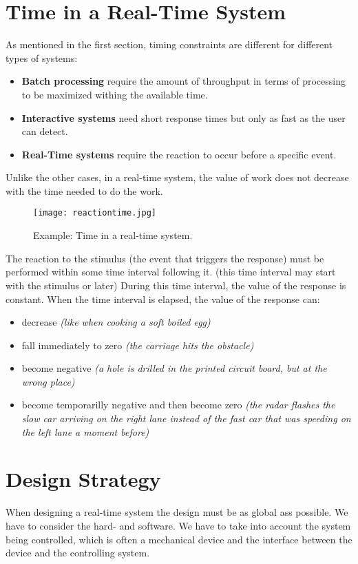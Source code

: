 \documentclass[../main.tex]{subfiles}
\begin{document}
\section{Time in a Real-Time System}
As mentioned in the first section, timing constraints are different for different types of systems:
\begin{itemize}
	\item \textbf{Batch processing} require the amount of throughput in terms of processing to be maximized withing the available time.
	\item \textbf{Interactive systems} need short response times but only as fast as the user can detect.
	\item \textbf{Real-Time systems} require the reaction to occur before a specific event.
\end{itemize}
Unlike the other cases, in a real-time system, the value of work does not decrease with the time needed to do the work. 

\begin{figure}[H]
    \centering
    \texttt{[image: reactiontime.jpg]}
    \caption{Example: Time in a real-time system.}
    \label{rttime}
\end{figure}
The reaction to the stimulus (the event that triggers the response) must be performed within some time interval following it. (this time interval may start with the stimulus or later) During this time interval, the value of the response is constant. When the time interval is elapsed, the value of the response can:
\begin{itemize}
	\item decrease \textit{(like when cooking a soft boiled egg)}
	\item fall immediately to zero \textit{(the carriage hits the obstacle)}
	\item become negative \textit{(a hole is drilled in the printed circuit board, but at the wrong place)}
	\item become temporarilly negative and then become zero\textit{ (the radar flashes the slow car arriving on the right lane instead of the fast car that was speeding on the left lane a moment before)}
\end{itemize}

\section{Design Strategy}
When designing a real-time system the design must be as global ass possible. We have to consider the hard- and software. We have to take into account the system being controlled, which is often a mechanical device and the interface between the device and the controlling system.
\end{document}
